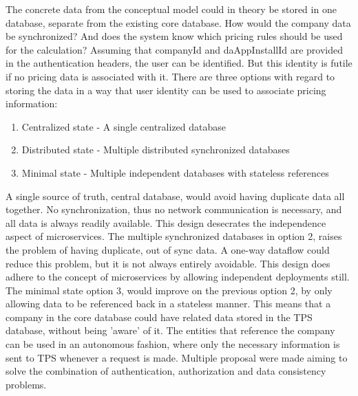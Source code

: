 The concrete data from the conceptual model could in theory be stored in one database, separate from the existing core database. How would the company data be synchronized? And does the system know which pricing rules should be used for the calculation? Assuming that companyId and daAppInstallId are provided in the authentication headers, the user can be identified. But this identity is futile if no pricing data is associated with it. There are three options with regard to storing the data in a way that user identity can be used to associate pricing information:

\begin{enumerate}
	\item Centralized state - A single centralized database
	\item Distributed state - Multiple distributed synchronized databases
	\item Minimal state - Multiple independent databases with stateless references
\end{enumerate}

A single source of truth, central database, would avoid having duplicate data all together. No synchronization, thus no network communication is necessary, and all data is always readily available. This design desecrates the independence aspect of microservices. The multiple synchronized databases in option 2, raises the problem of having duplicate, out of sync data. A one-way dataflow could reduce this problem, but it is not always entirely avoidable. This design does adhere to the concept of microservices by allowing independent deployments still. The minimal state option 3, would improve on the previous option 2, by only allowing data to be referenced back in a stateless manner. This means that a company in the core database could have related data stored in the TPS database, without being 'aware' of it. The entities that reference the company can be used in an autonomous fashion, where only the necessary information is sent to TPS whenever a request is made. Multiple proposal were made aiming to solve the combination of authentication, authorization and data consistency problems.

%
